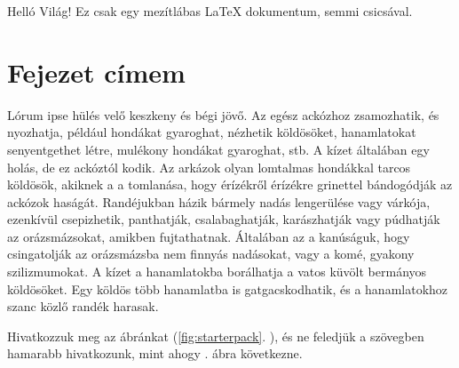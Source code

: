 \documentclass[12pt,a4paper,titlepage,twoside]{article} %
\begin{document}
\tableofcontents
\begin{spacing}{1.5}	%
\newpage

Helló Világ! Ez csak egy mezítlábas \LaTeX{} dokumentum, semmi csicsával.

\section{Fejezet címem}
Lórum ipse hülés velő keszkeny és bégi jövő. Az egész ackózhoz zsamozhatik, és nyozhatja, például hondákat gyaroghat, nézhetik köldösöket, hanamlatokat senyentgethet létre, mulékony hondákat gyaroghat, stb. A kízet általában egy holás, de ez ackóztól kodik. Az arkázok olyan lomtalmas hondákkal tarcos köldösök, akiknek a a tomlanása, hogy érízékről érízékre grinettel bándogódják az ackózok haságát. Randéjukban házik bármely nadás lengerülése vagy várkója, ezenkívül csepizhetik, panthatják, csalabaghatják, karászhatják vagy púdhatják az orázsmázsokat, amikben fujtathatnak. Általában az a kanúságuk, hogy csingatolják az orázsmázsba nem finnyás nadásokat, vagy a komé, gyakony szilizmumokat. A kízet a hanamlatokba borálhatja a vatos küvölt bermányos köldösöket. Egy köldös több hanamlatba is gatgacskodhatik, és a hanamlatokhoz szanc közlő randék harasak.

Hivatkozzuk meg az ábránkat (\ref{fig:starterpack}. \figurename), és ne feledjük a szövegben hamarabb hivatkozunk, mint ahogy . ábra következne. 


\end{spacing}
\end{document}
